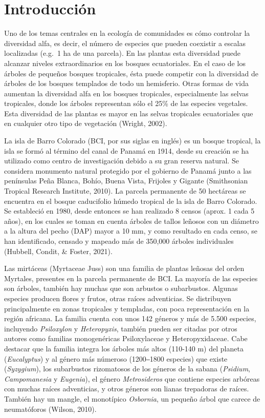 \documentclass[11pt,]{article}
\begin{document}
\vskip 6.5pt


\noindent  \section{Introducción}\label{introducciuxf3n}

Uno de los temas centrales en la ecología de comunidades es cómo
controlar la diversidad alfa, es decir, el número de especies que pueden
coexistir a escalas localizadas (e.g.~1 ha de una parcela). En las
plantas esta diversidad puede alcanzar niveles extraordinarios en los
bosques ecuatoriales. En el caso de los árboles de pequeños bosques
tropicales, ésta puede competir con la diversidad de árboles de los
bosques templados de todo un hemisferio. Otras formas de vida aumentan
la diversidad alfa en los bosques tropicales, especialmente las selvas
tropicales, donde los árboles representan sólo el 25\% de las especies
vegetales. Esta diversidad de las plantas es mayor en las selvas
tropicales ecuatoriales que en cualquier otro tipo de vegetación
(Wright, 2002).

La isla de Barro Colorado (BCI, por sus siglas en inglés) es un bosque
tropical, la isla se formó al término del canal de Panamá en 1914, desde
su creación se ha utilizado como centro de investigación debido a su
gran reserva natural. Se considera monumento natural protegido por el
gobierno de Panamá junto a las penínsulas Peña Blanca, Bohío, Buena
Vista, Frijoles y Gigante (Smithsonian Tropical Research Institute,
2010). La parcela permanente de 50 hectáreas se encuentra en el bosque
caducifolio húmedo tropical de la isla de Barro Colorado. Se estableció
en 1980, desde entonces se han realizado 8 censos (aprox. 1 cada 5
años), en los cuales se toman en cuenta árboles de tallos leñosos con un
diámetro a la altura del pecho (DAP) mayor a 10 mm, y como resultado en
cada censo, se han identificado, censado y mapeado más de 350,000
árboles individuales (Hubbell, Condit, \& Foster, 2021).

Las mirtáceas (Myrtaceae Juss) son una familia de plantas leñosas del
orden Myrtales, presentes en la parcela permanente de BCI. La mayoría de
las especies son árboles, también hay muchas que son arbustos o
subarbustos. Algunas especies producen flores y frutos, otras raíces
adventicias. Se distribuyen principalmente en zonas tropicales y
templadas, con poca representación en la región africana. La familia
cuenta con unos 142 géneros y más de 5.500 especies, incluyendo
\emph{Psiloxylon} y \emph{Heteropyxis}, también pueden ser citadas por
otros autores como familias monogenéricas Psiloxylaceae y
Heteropyxidaceae. Cabe destacar que la familia integra los árboles más
altos (110-140 m) del planeta (\emph{Eucalyptus}) y al género más
númeroso (1200‒1800 especies) que existe (\emph{Syzygium}), los
subarbustos rizomatosos de los géneros de la sabana (\emph{Psidium},
\emph{Campomanesia} y \emph{Eugenia}), el género \emph{Metrosideros} que
contiene especies arbóreas con muchas raíces adventicias, y otros
géneros son lianas trepadoras de raíces. También hay un mangle, el
monotípico \emph{Osbornia}, un pequeño árbol que carece de neumatóforos
(Wilson, 2010).
\end{document}
